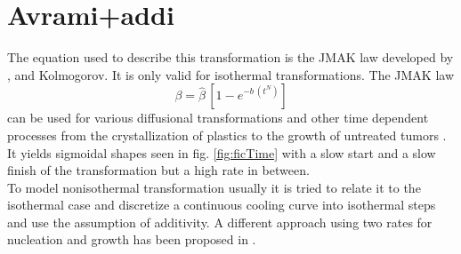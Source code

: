 \section{Avrami+addi}

The equation used to describe this transformation is the JMAK law developed by \cite{johnson_reaction_1939}, \cite{avrami_kinetics_1940} and Kolmogorov. It is only valid for isothermal transformations. 
The JMAK law 
\begin{equation}
	\beta = \hat{\beta}\,[1-e^{-b\,(t^{N})}] \label{eq:JMAK}
\end{equation}
can be used for various diffusional transformations and other time dependent processes from the crystallization of plastics \cite{cebe_application_1988} to the growth of untreated tumors \cite{villar_goris_correspondence_2020}.\\
It yields sigmoidal shapes seen in fig. \ref{fig:ficTime} with a slow start and a slow finish of the transformation but a high rate in between. \\

To model nonisothermal transformation usually it is tried to relate it to the isothermal case and discretize a continuous cooling curve into isothermal steps and use the assumption of additivity. A different approach using two rates for nucleation and growth has been proposed in \cite{fasano_modelling_1991}. 


